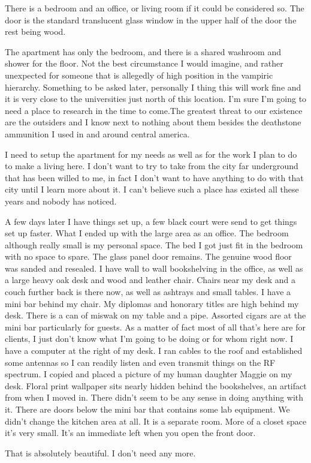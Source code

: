 There is a bedroom and an office, or living room if it could be considered so. The door is the standard translucent glass window in the upper half of the door the rest being wood.

The apartment has only the bedroom, and there is a shared washroom and shower for the floor. Not the best circumstance I would imagine, and rather unexpected for someone that is allegedly of high position in the vampiric hierarchy. Something to be asked later, personally I thing this will work fine and it is very close to the universities just north of this location. I’m sure I’m going to need a place to research in the time to come.The greatest threat to our existence are the outsiders and I know next to nothing about them besides the deathstone ammunition I used in and around central america.

I need to setup the apartment for my needs as well as for the work I plan to do to make a living here. I don’t want to try to take from the city far underground that has been willed to me, in fact I don’t want to have anything to do with that city until I learn more about it. I can’t believe such a place has existed all these years and nobody has noticed.

\parasep{}

A few days later I have things set up, a few black court were send to get things set up faster. What I ended up with the large area as an office. The bedroom although really small is my personal space. The bed I got just fit in the bedroom with no space to spare. The glass panel door remains. The genuine wood floor was sanded and resealed. I have wall to wall bookshelving in the office, as well as a large heavy oak desk and wood and leather chair. Chairs near my desk and a couch further back is there now, as well as ashtrays and small tables. I have a mini bar behind my chair. My diplomas and honorary titles are high behind my desk. There is a can of miswak on my table and a pipe. Assorted cigars are at the mini bar particularly for guests. As a matter of fact most of all that’s here are for clients, I just don’t know what I’m going to be doing or for whom right now. I have a computer at the right of my desk. I ran cables to the roof and established some antennas so I can readily listen and even transmit things on the RF spectrum. I copied and placed a picture of my human daughter Maggie on my desk. Floral print wallpaper sits nearly hidden behind the bookshelves, an artifact from when I moved in. There didn’t seem to be any sense in doing anything with it. There are doors below the mini bar that contains some lab equipment. We didn’t change the kitchen area at all. It is a separate room. More of a closet space it’s very small. It’s an immediate left when you open the front door.

That is absolutely beautiful. I don’t need any more.


 